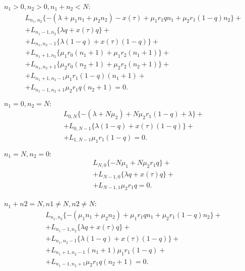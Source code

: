 $n_{1}>0, n_{2}>0, n_{1}+n_{2}< N$:\\
\begin{equation}\label{rEquationLong3}
	\begin{split}
		&L_{n_{1}, n_{2}}\{-(\lambda+\mu_{1}n_{1}+\mu_{2}n_{2}) - x(\tau)+ \mu_{1}r_{1}qn_{1}+ \mu_{2}r_{1}(1-q)n_{2}\}+\\
		&+L_{n_{1}-1, n_{2}}\{\lambda q+ x(\tau) q  \}+\\
		&+L_{n_{1}, n_{2}-1}\{\lambda (1-q) + x(\tau) (1-q) \}+\\
		&+L_{n_{1} +1 , n_{2}}\{ \mu_{1} r_{0}(n_{1}+1) + \mu_{1} r_{2} (n_{1}+1)\}+\\
		&+L_{n_{1}, n_{2} + 1 }\{ \mu_{2} r_{0}(n_{2}+1)  + \mu_{2} r_{2} (n_{2}+1) \}+\\
		&+L_{n_{1} +1 , n_{2}-1}\mu_{1} r_{1}(1-q)(n_{1}+1) +\\
		&+ L_{n_{1} -1 , n_{2}+1}\mu_{2} r_{1}q(n_{2}+1)=0.
	\end{split}
\end{equation}

$n_{1}=0, n_{2}=N:$\\
\begin{equation}\label{rEquationLong4}
	\begin{split}
		&L_{0, N}\{-(\lambda+N\mu_{2}) + N\mu_{2}r_{1}(1-q)+ \lambda \}+\\
		&+L_{0, N-1}\{\lambda (1-q) + x(\tau) (1-q) \}+\\
		&+L_{1 ,N-1}\mu_{1} r_{1}(1-q) =0.
	\end{split}
\end{equation}

$n_{1}=N, n_{2}=0:$\\
\begin{equation}\label{rEquationLong5}
	\begin{split}
		&L_{N, 0}\{-N\mu_{1}+ N\mu_{2}r_{1}q\}+\\
		&+L_{N-1, 0}\{\lambda q+ x(\tau) q  \}+\\
		&+L_{N -1 , 1}\mu_{2} r_{1}q =0.
	\end{split}
\end{equation}

$n_{1}+n{2}=N, n{1}\neq N, n{2}\neq N$:\\
\begin{equation}\label{rEquationLong6}
	\begin{split}
		&L_{n_{1}, n_{2}}\{-(\mu_{1}n_{1}+\mu_{2}n_{2}) + \mu_{1}r_{1}qn_{1}+ \mu_{2}r_{1}(1-q)n_{2}\}+\\
		&+L_{n_{1}-1, n_{2}}\{\lambda q+ x(\tau) q  \}+\\
		&+L_{n_{1}, n_{2}-1}\{\lambda (1-q) +	 x(\tau) (1-q) \}+\\
		&+L_{n_{1} +1 , n_{2}-1}(n_{1}+1)\mu_{1} r_{1}(1-q) +\\
		&+L_{n_{1} -1 , n_{2}+1}\mu_{2} r_{1}q(n_{2}+1) =0.
	\end{split}
\end{equation}

